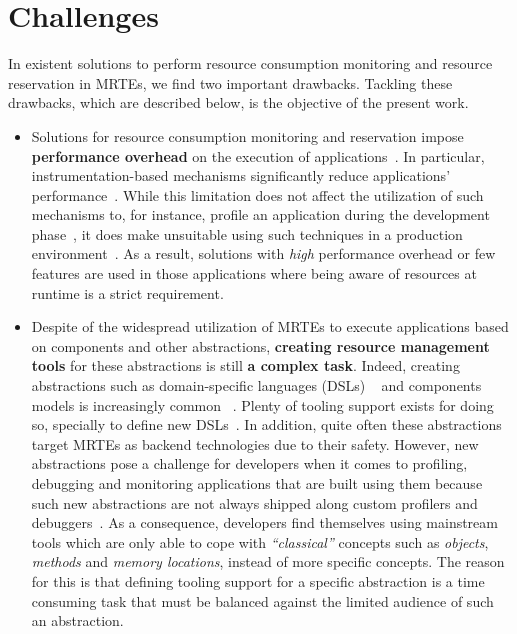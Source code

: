 \section{Challenges} \label{sec:intro-challenges}

In existent solutions to perform resource consumption monitoring and resource reservation in MRTEs, we find two important drawbacks.
Tackling these drawbacks, which are described below, is the objective of the present work.

\begin{itemize}
\item Solutions for resource consumption monitoring and reservation impose \textbf{performance overhead} on the execution of applications~\cite{Binder:2006:FEM:1173706.1173733,Marek:2012:DEL:2162037.2162046,Reiss:2008:CDP:1383559.1383566,Maurel:2012:AME:2304736.2304763}.
In particular, instrumentation-based mechanisms significantly reduce applications' performance~\cite{Dmitriev:2004:PJA:974043.974067,czajkowski_jres:_1998,Binder:2009:PPV:1464245.1464249}.
While this limitation does not affect the utilization of such mechanisms to, for instance, profile an application during the development phase~\cite{czajkowski_jres:_1998,binder_extending_2005,binder_portable_2001,Maebe06javana:a,Moret:2011:PBI:1960275.1960292, Hulaas:2008:PTL}, it does make unsuitable using such techniques in a production environment~\cite{Dmitriev:2004:PJA:974043.974067}.
As a result, solutions with \textit{high} performance overhead or few features are used in those applications where being aware of resources at runtime is a strict requirement.

\item Despite of the widespread utilization of MRTEs to execute applications based on components and other abstractions, \textbf{creating resource management tools} for these abstractions is still \textbf{a complex task}.
Indeed, creating abstractions such as domain-specific languages (DSLs) ~\cite{van2000domain,Fowler:2010:DSL:1809745} and components models is increasingly common ~\cite{van2000domain,hutchinson2011empirical,whittle2014state}.
Plenty of tooling support exists for doing so, specially to define new DSLs~\cite{raey,Merkle:2010:TMT:1869542.1869564,Eysholdt:2010:XIY:1869542.1869625}.
In addition, quite often these abstractions target MRTEs as backend technologies due to their safety.
However, new abstractions pose a challenge for developers when it comes to profiling, debugging and monitoring applications that are built using them because such new abstractions are not always shipped along custom profilers and debuggers~\cite{Kolomvatsos:2012:DAC:2148250.2148478,Wu:2008:GGD:1394966.1394970,Mannadiar:2010:DDM:1964571.1964595,Lindeman:2011:DDD:2047862.2047885,Wu:2005:TDL:1094855.1094920,Faith1998}.
As a consequence, developers find themselves using mainstream tools which are only able to cope with \textit{``classical''} concepts such as \textit{objects}, \textit{methods} and \textit{memory locations}, instead of more specific concepts.
The reason for this is that defining tooling support for a specific abstraction is a time consuming task that must be balanced against the limited audience of such an abstraction.
\end{itemize}
 
